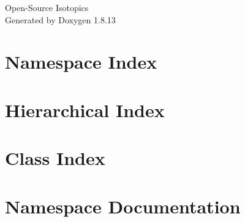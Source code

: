 \documentclass[twoside]{book}
\newcommand{\+}{\discretionary{\mbox{\scriptsize$\hookleftarrow$}}{}{}}
\newcommand{\clearemptydoublepage}{%
  \newpage{\pagestyle{empty}\cleardoublepage}%
}
\begin{document}
\hypersetup{pageanchor=false,
             bookmarksnumbered=true,
             pdfencoding=unicode
            }
\begin{titlepage}
\vspace*{7cm}
\begin{center}%
{\Large Open-\/\+Source Isotopics }\\
\vspace*{1cm}
{\large Generated by Doxygen 1.8.13}\\
\end{center}
\end{titlepage}
\clearemptydoublepage
{}
\tableofcontents
\clearemptydoublepage
{}
\hypersetup{pageanchor=true}

\chapter{Namespace Index}

\chapter{Hierarchical Index}

\chapter{Class Index}

\chapter{Namespace Documentation}





\end{document}
